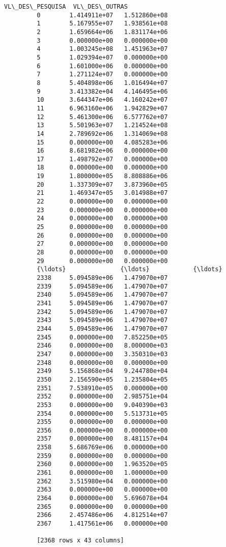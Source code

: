 \documentclass[11pt]{article}
\begin{document}
\begin{Verbatim}[commandchars=\\\{\}]
               VL\_DES\_PESQUISA  VL\_DES\_OUTRAS  
         0        1.414911e+07   1.512860e+08  
         1        5.167955e+07   1.938561e+08  
         2        1.659664e+06   1.831174e+06  
         3        0.000000e+00   0.000000e+00  
         4        1.003245e+08   1.451963e+07  
         5        1.029394e+07   0.000000e+00  
         6        1.601000e+06   0.000000e+00  
         7        1.271124e+07   0.000000e+00  
         8        5.404898e+06   1.016494e+07  
         9        3.413382e+04   4.146495e+06  
         10       3.644347e+06   4.160242e+07  
         11       6.963160e+06   1.942829e+07  
         12       5.461300e+06   6.577762e+07  
         13       5.501963e+07   1.214524e+08  
         14       2.789692e+06   1.314069e+08  
         15       0.000000e+00   4.085283e+06  
         16       8.681982e+06   0.000000e+00  
         17       1.498792e+07   0.000000e+00  
         18       0.000000e+00   0.000000e+00  
         19       1.800000e+05   8.808886e+06  
         20       1.337309e+07   3.873960e+05  
         21       1.469347e+05   3.014988e+07  
         22       0.000000e+00   0.000000e+00  
         23       0.000000e+00   0.000000e+00  
         24       0.000000e+00   0.000000e+00  
         25       0.000000e+00   0.000000e+00  
         26       0.000000e+00   0.000000e+00  
         27       0.000000e+00   0.000000e+00  
         28       0.000000e+00   0.000000e+00  
         29       0.000000e+00   0.000000e+00  
         {\ldots}               {\ldots}            {\ldots}  
         2338     5.094589e+06   1.479070e+07  
         2339     5.094589e+06   1.479070e+07  
         2340     5.094589e+06   1.479070e+07  
         2341     5.094589e+06   1.479070e+07  
         2342     5.094589e+06   1.479070e+07  
         2343     5.094589e+06   1.479070e+07  
         2344     5.094589e+06   1.479070e+07  
         2345     0.000000e+00   7.852250e+05  
         2346     0.000000e+00   8.000000e+03  
         2347     0.000000e+00   3.350310e+03  
         2348     0.000000e+00   0.000000e+00  
         2349     5.156868e+04   9.244780e+04  
         2350     2.156590e+05   1.235804e+05  
         2351     7.538910e+05   0.000000e+00  
         2352     0.000000e+00   2.985751e+04  
         2353     0.000000e+00   9.040390e+03  
         2354     0.000000e+00   5.513731e+05  
         2355     0.000000e+00   0.000000e+00  
         2356     0.000000e+00   0.000000e+00  
         2357     0.000000e+00   8.481157e+04  
         2358     5.686769e+06   0.000000e+00  
         2359     0.000000e+00   0.000000e+00  
         2360     0.000000e+00   1.963520e+05  
         2361     0.000000e+00   1.000000e+00  
         2362     3.515980e+04   0.000000e+00  
         2363     0.000000e+00   0.000000e+00  
         2364     0.000000e+00   5.696078e+04  
         2365     0.000000e+00   0.000000e+00  
         2366     2.457486e+06   4.812514e+07  
         2367     1.417561e+06   0.000000e+00  
         
         [2368 rows x 43 columns]
\end{Verbatim}
            
\end{document}
